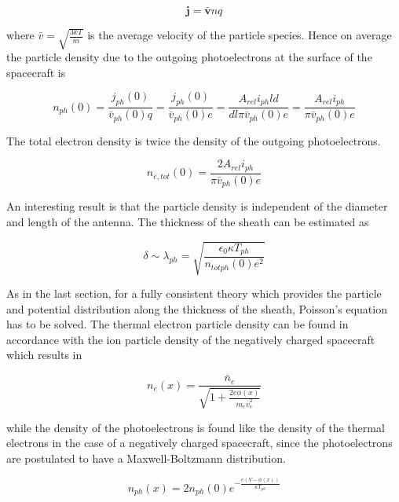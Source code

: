 \documentclass[a4paper,11pt]{thesis}
\begin{document}
\begin{equation}
\mathbf{j}=\bar{\mathbf{v}}nq
\end{equation}

where $\bar{v}=\sqrt{\frac{3kT}{m}}$ is the average velocity of the particle species. Hence on average the particle density due to the outgoing photoelectrons at the surface of the spacecraft is

\begin{equation}
n_{ph}(0)=\frac{j_{ph}(0)}{{\bar{v}_{ph}(0) q}}=\frac{j_{ph}(0)}{\bar{v}_{ph}(0)e}=\frac{A_{rel} i_{ph}ld}{dl\pi\bar{v}_{ph}(0)e}=\frac{A_{rel} i_{ph}}{\pi\bar{v}_{ph}(0)e}
\end{equation}

The total electron density is twice the density of the outgoing photoelectrons.

\begin{equation}\label{ne0}
n_{e,tot}(0)=\frac{2 A_{rel} i_{ph}}{\pi\bar{v}_{ph}(0)e}
\end{equation}

An interesting result is that the particle density is independent of the diameter and length of the antenna. The thickness of the sheath can be estimated as

\begin{equation}
    \delta \sim \lambda_{ph}=\sqrt{\frac{\epsilon_0 \kappa T_{ph}}{n_{totph}(0) e^2}}
\end{equation}

As in the last section, for a fully consistent theory which provides the particle and potential distribution along the thickness of the sheath, Poisson's equation has to be solved. The thermal electron particle density can be found in accordance with the ion particle density of the negatively charged spacecraft which results in

\begin{equation}
    n_e(x)=\frac{\bar{n}_e}{\sqrt{1+\frac{2e\phi(x)}{m_e\bar{v}_e^2}}}
\end{equation}

while the density of the photoelectrons is found like the density of the thermal electrons in the case of a negatively charged spacecraft, since the photoelectrons are postulated to have a Maxwell-Boltzmann distribution.

\begin{equation}\label{eq:photoelectron_density}
    n_{ph}(x)=2n_{ph}(0) e^{-\frac{e(V-\phi(x))}{\kappa T_{ph}}}
\end{equation}
\end{document}
